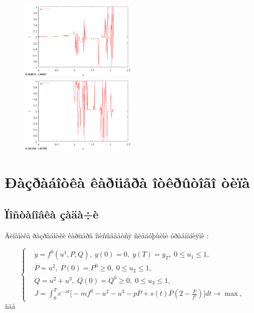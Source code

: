 \documentclass[14pt]{article}
\begin{document}
\begin{figure}
\begin{floatrow}
    {\includegraphics[width=0.5\textwidth]{task3_v1}}
    {\includegraphics[width=0.5\textwidth]{task3_v2}}
\end{floatrow}
\end{figure}

\newpage
\section{Ðàçðàáîòêà êàðüåðà îòêðûòîãî òèïà}
\subsection{Ïîñòàíîâêà çàäà÷è}

Äèíàìèêà ðàçðàáîòêè êàðüåðà îïèñûâàåòñÿ ñëåäóþùèìè óðàâíåíèÿìè :

\begin{equation}\label{syst4}
\left\{ \begin{aligned}
& \dot{y} = f^0(u^1,P,Q), \;  y(0)=0, \; y(T) = y_T, \; 0 \le u_1 \le 1, \\
& \dot{P} = u^2, \; P(0) = P^0 \ge 0, \; 0 \le u_2 \le 1,\\
& \dot{Q} = u^2+u^3, \; Q(0) = Q^0 \ge 0, \; 0 \le u_3 \le 1, \\
& J = \int_0^T e^{-\nu t} \Big[ -m f^0 - u^2 - u^3 - p P + s(t)P(2-\frac{P}{f^0}) \Big] dt \rightarrow \max,
\end{aligned}\right.
\end{equation}
ãäå
\end{document}
